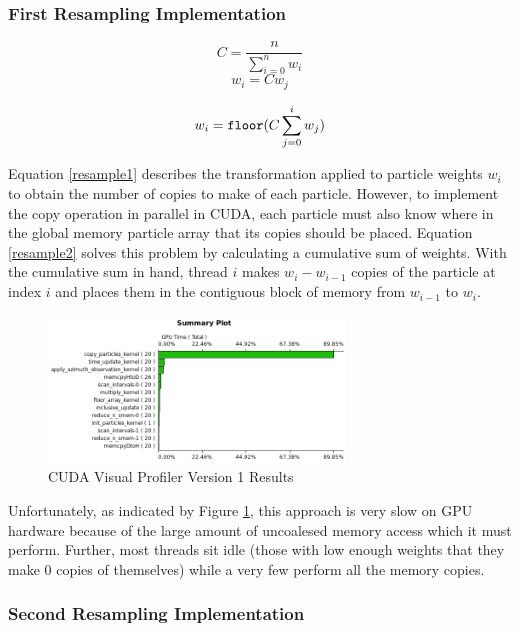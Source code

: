\documentclass{article}
\begin{document}
\subsubsection{First Resampling Implementation}

\[ C = \frac{n}{\sum_{i=0}^{n} w_{i}} \]
\begin{equation}\label{resample1}
w_{i}=C w_{j}
\end{equation}

\begin{equation}\label{resample2}
w_{i}=\verb!floor!(C\sum_{j=0}^{i} w_{j})
\end{equation}

Equation \ref{resample1} describes the transformation applied to particle weights \(w_{i}\) to obtain the number of copies to make of each particle. However, to implement the copy operation in parallel in CUDA, each particle must also know where in the global memory particle array that its copies should be placed. Equation \ref{resample2} solves this problem by calculating a cumulative sum of weights. With the cumulative sum in hand, thread \(i\) makes \(w_{i}-w_{i-1}\) copies of the particle at index \(i\) and places them in the contiguous block of memory from \(w_{i-1}\) to \(w_{i}\).

\begin{figure}
\centering
\includegraphics[width=0.7\textwidth]{data/profile_cuda_version1_pic1.png}
\caption{CUDA Visual Profiler Version 1 Results}
\label{profiler1}
\end{figure}

Unfortunately, as indicated by Figure \ref{profiler1}, this approach is very slow on GPU hardware because of the large amount of uncoalesed memory access which it must perform. Further, most threads sit idle (those with low enough weights that they make 0 copies of themselves) while a very few perform all the memory copies.

\subsubsection{Second Resampling Implementation}\label{resamplesection2}
\end{document}
